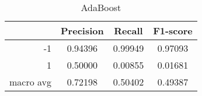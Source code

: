 \begin{table}[!h]
    \centering
    \renewcommand{\arraystretch}{1.5}
    \begin{tabular}{|r|c|c|c|}
        \hline
                  & Precision & Recall & F1-score \\ \hline
        -1        &     0.94396     &     0.99949   &    0.97093      \\ \hline
        1         &     0.50000      &     0.00855   &   0.01681       \\ \hline
        macro avg &      0.72198     &     0.50402   &    0.49387      \\ \hline
    \end{tabular}
    \caption{AdaBoost}
\end{table}
